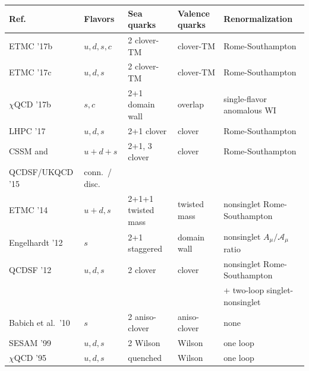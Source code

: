 \begin{table}[!t]
\renewcommand{\arraystretch}{1.2} 
\centering
\footnotesize
\begin{threeparttable}
\begin{tabular}{lllll}
\toprule
Ref. & Flavors & Sea quarks & Valence quarks & Renormalization \\
\midrule

  ETMC '17b \cite{Alexandrou:2017hac} &
  $u,d,s,c$ & 2 clover-TM & clover-TM & Rome-Southampton \\

  ETMC '17c \cite{Alexandrou:2017oeh} &
  $u,d,s$ & 2 clover-TM & clover-TM & Rome-Southampton \\

  $\chi$QCD '17b \cite{Gong:2015iir} &
  $s,c$ & 2+1 domain wall & overlap & single-flavor anomalous WI \\

  LHPC '17 \cite{Green:2017keo} &
  $u,d,s$ & 2+1 clover & clover & Rome-Southampton \\

  CSSM and &
  $u+d+s$ &
  2+1, 3 clover & clover & Rome-Southampton \\
  QCDSF/UKQCD '15 \cite{Chambers:2015bka} & conn.\ / disc. & & & \\

  ETMC '14 \cite{Abdel-Rehim:2013wlz} &
  $u+d,s$ & 2+1+1 twisted mass & twisted mass & nonsinglet Rome-Southampton\\

  Engelhardt '12 \cite{Engelhardt:2012gd} &
  $s$ & 2+1 staggered & domain wall & nonsinglet $A_\mu/\mathcal{A}_\mu$ ratio \\

  QCDSF '12 \cite{QCDSF:2011aa} &
  $u,d,s$ & 2 clover & clover & nonsinglet Rome-Southampton \\
  & & & &+ two-loop singlet-nonsinglet\\

  Babich et al.\ '10 \cite{Babich:2010at} &
  $s$ & 2 aniso-clover & aniso-clover & none \\

  SESAM '99 \cite{Gusken:1999as} &
  $u,d,s$ & 2 Wilson & Wilson & one loop \\

  $\chi$QCD '95 \cite{Dong:1995rx} &
  $u,d,s$ & quenched & Wilson & one loop \\


\end{tabular}
\end{threeparttable}
\end{table}
